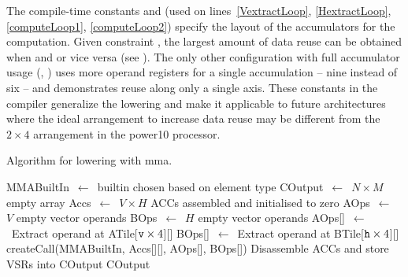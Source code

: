 \documentclass[\main/thesis.tex]{subfiles}
\begin{document}
The compile-time constants  and  (used on lines~\ref{VextractLoop}, \ref{HextractLoop}, \ref{computeLoop1}, \ref{computeLoop2}) specify the layout of the accumulators for the computation.
Given constraint , the largest amount of data reuse can be obtained when  and  or vice versa (see ).
The only other configuration with full accumulator usage (, ) uses more operand registers for a single accumulation -- nine instead of six -- and demonstrates reuse along only a single axis.
These constants in the compiler generalize the lowering and make it applicable to future architectures where the ideal arrangement to increase data reuse may be different from the $2 \times 4$ arrangement in the \gls{power10} processor.

\begin{algorithm}[t]
  \caption[Algorithm for lowering ]{Algorithm for lowering  with \gls{mma}.}
  \label{alg:intrinsic}
  \begin{algorithmic}[1]
    \State MMABuiltIn~$\gets$~builtin chosen based on element type\label{chooseBuiltin}
    \State COutput~$\gets$~$N \times M$ empty array\label{createC}
    \State Accs~$\gets$~$V \times H$ ACCs assembled and initialised to zero\label{zeroAccs}
    \label{unrollLoopStart}
      \State AOps~$\gets$~$V$ empty vector operands
      \State BOps~$\gets$~$H$ empty vector operands
      \label{VextractLoop}
        \State AOps[]~$\gets$~Extract operand at ATile[$\text{\code{v}} \times 4$][]\label{aOps}
        \EndFor
      \label{HextractLoop}
         \State BOps[]~$\gets$~Extract operand at BTile[$\text{\code{h}} \times 4$][]\label{bOps}
      \EndFor
      \label{computeLoop1}
        \label{computeLoop2}
          \State createCall(MMABuiltIn, {Accs[][], AOps[], BOps[]})\label{builtinCallCreate}
        \EndFor
      \EndFor
    \EndFor\label{accLoopEnd}
    \State Disassemble ACCs and store VSRs into COutput\label{disStore}
    \State \Return COutput\label{return}
    \EndFunction
  \end{algorithmic}
\end{algorithm}
\end{document}
